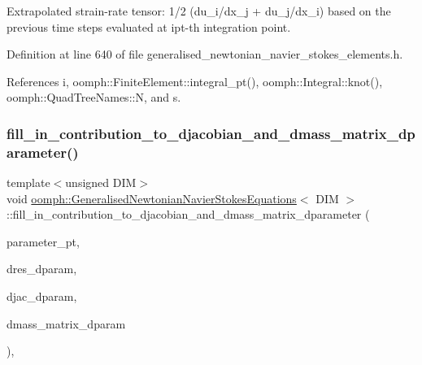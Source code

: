 Extrapolated strain-\/rate tensor\+: 1/2 (du\+\_\+i/dx\+\_\+j + du\+\_\+j/dx\+\_\+i) based on the previous time steps evaluated at ipt-\/th integration point. 



Definition at line 640 of file generalised\+\_\+newtonian\+\_\+navier\+\_\+stokes\+\_\+elements.\+h.



References i, oomph\+::\+Finite\+Element\+::integral\+\_\+pt(), oomph\+::\+Integral\+::knot(), oomph\+::\+Quad\+Tree\+Names\+::N, and s.

\mbox{\label{classoomph_1_1GeneralisedNewtonianNavierStokesEquations_a9db1ab85593b9eb02744bad781f64204}} 
\subsubsection{\texorpdfstring{fill\+\_\+in\+\_\+contribution\+\_\+to\+\_\+djacobian\+\_\+and\+\_\+dmass\+\_\+matrix\+\_\+dparameter()}{fill\_in\_contribution\_to\_djacobian\_and\_dmass\_matrix\_dparameter()}}
{\footnotesize\ttfamily template$<$unsigned D\+IM$>$ \\
void \hyperlink{classoomph_1_1GeneralisedNewtonianNavierStokesEquations}{oomph\+::\+Generalised\+Newtonian\+Navier\+Stokes\+Equations}$<$ D\+IM $>$\+::fill\+\_\+in\+\_\+contribution\+\_\+to\+\_\+djacobian\+\_\+and\+\_\+dmass\+\_\+matrix\+\_\+dparameter (\begin{DoxyParamCaption}\item[{double $\ast$const \&}]{parameter\+\_\+pt,  }\item[{\hyperlink{classoomph_1_1Vector}{Vector}$<$ double $>$ \&}]{dres\+\_\+dparam,  }\item[{\hyperlink{classoomph_1_1DenseMatrix}{Dense\+Matrix}$<$ double $>$ \&}]{djac\+\_\+dparam,  }\item[{\hyperlink{classoomph_1_1DenseMatrix}{Dense\+Matrix}$<$ double $>$ \&}]{dmass\+\_\+matrix\+\_\+dparam }\end{DoxyParamCaption})\hspace{0.3cm}{\ttfamily [inline]}, {\ttfamily [virtual]}}

